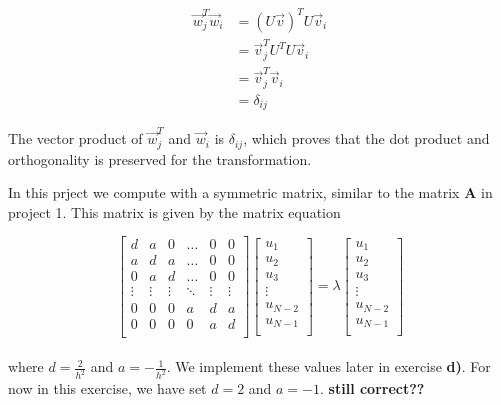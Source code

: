 \documentclass{article}
\begin{document}
\begin{align*}
  \vec{w}_j ^T \vec{w}_i &= (U \vec{v})^T U \vec{v}_i \\
  &= \vec{v}_j ^T U^T U \vec{v}_i \\
  &= \vec{v}_j ^T \vec{v}_i \\
  &= \delta _{ij}
\end{align*}

The vector product of $\vec{w}_j ^T$ and $\vec{w}_i$ is $\delta_{ij}$, which proves that the dot product and orthogonality is preserved for the transformation.

In this prject we compute with a symmetric matrix, similar to the matrix \textbf{A} in project 1. This matrix is given by the matrix equation

  \begin{equation*} \label{eq:fullmatrixeq}
    \begin{bmatrix}
        d & a & 0 & \dots & 0 & 0 \\
        a & d & a & \dots & 0 & 0 \\
        0 & a & d & \dots & 0 & 0 \\
        \vdots & \vdots & \vdots & \ddots & \vdots & \vdots \\
        0 & 0 & 0 & a & d & a \\
        0 & 0 & 0 & 0 & a & d \\
    \end{bmatrix}
    \begin{bmatrix}
        u_1 \\
        u_2 \\
        u_3 \\
        \vdots \\
        u_{N-2} \\
        u_{N-1} \\
    \end{bmatrix}
      = \lambda
    \begin{bmatrix}
        u_1 \\
        u_2 \\
        u_3 \\
        \vdots \\
        u_{N-2} \\
        u_{N-1} \\
    \end{bmatrix}
  \end{equation*} \\

where $d = \frac{2}{h^2}$ and $a = - \frac{1}{h^2}$. We implement these values later in exercise \textbf{d)}. For now in this exercise, we have set $d = 2$ and $a = - 1$.
\textbf{still correct??} \\
\end{document}
